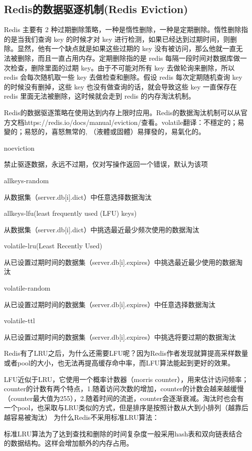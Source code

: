 \documentclass[../../../interview-questions.tex]{subfiles}
\begin{document}
\subsection{Redis的数据驱逐机制(Redis Eviction)}

Redis 主要有 2 种过期删除策略，一种是惰性删除，一种是定期删除。惰性删除指的是当我们查询 key 的时候才对 key 进行检测，如果已经达到过期时间，则删除。显然，他有一个缺点就是如果这些过期的 key 没有被访问，那么他就一直无法被删除，而且一直占用内存。定期删除指的是 redis 每隔一段时间对数据库做一次检查，删除里面的过期 key。由于不可能对所有 key 去做轮询来删除，所以 redis 会每次随机取一些 key 去做检查和删除。假设 redis 每次定期随机查询 key 的时候没有删掉，这些 key 也没有做查询的话，就会导致这些 key 一直保存在 redis 里面无法被删除，这时候就会走到 redis 的内存淘汰机制。

Redis的数据驱逐策略在使用达到内存上限时应用。Redis的数据淘汰机制可以从官方文档https://redis.io/docs/manual/eviction/查看。volatile翻译：不穩定的；易變的；易怒的，喜怒無常的, （液體或固體）易揮發的，易氣化的。

noeviction

禁止驱逐数据，永远不过期，仅对写操作返回一个错误，默认为该项

allkeys-random

从数据集（server.db[i].dict）中任意选择数据淘汰

allkeys-lfu(least frequently used (LFU) keys)

从数据集（server.db[i].dict）中挑选最近最少频次使用的数据淘汰

volatile-lru(Least Recently Used)

从已设置过期时间的数据集（server.db[i].expires）中挑选最近最少使用的数据淘汰

volatile-random

从已设置过期时间的数据集（server.db[i].expires）中任意选择数据淘汰

volatile-ttl

从已设置过期时间的数据集（server.db[i].expires）中挑选将要过期的数据淘汰


Redis有了LRU之后，为什么还需要LFU呢？因为Redis作者发现就算提高采样数量或者pool的大小，也无法再提高缓存命中率，而LFU算法能起到更好的效果。

LFU近似于LRU，它使用一个概率计数器（morris counter），用来估计访问频率；counter的计数有两个特点，1.随着访问次数的增加，counter的计数会越来越缓慢（counter最大值为255），2.随着时间的流逝，counter会逐渐衰减。淘汰时也会有一个pool，也采取与LRU类似的方式，但是排序是按照计数从大到小排列（越靠后越容易被淘汰）
为什么Redis不采用标准LRU算法：

标准LRU算法为了达到查找和删除的时间复杂度一般采用hash表和双向链表结合的数据结构。这样会增加额外的内存占用。
\end{document}
